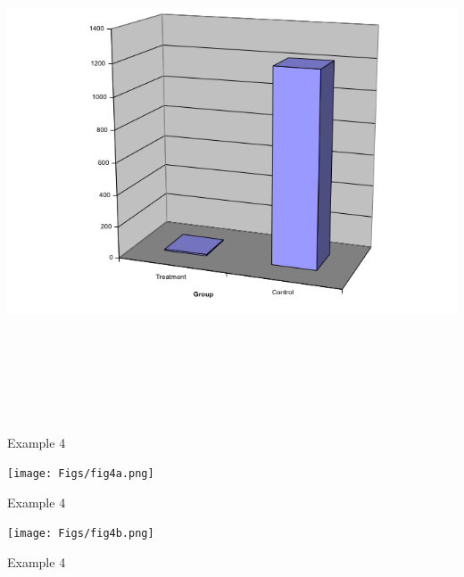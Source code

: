 \documentclass[12pt]{article}
\newcommand{\headsize}{\fontsize{35}{35} \selectfont}
\begin{document}
\centerline{\includegraphics[height=6in]{Figs/fig3d.png}}

\newpage


\headsize \color{myyellow}
\hfill \begin{minipage}{5.75in}
\centering
Example 4
\end{minipage}

\vspace{30mm}

\centerline{\texttt{[image: Figs/fig4a.png]}}




\newpage


\headsize \color{myyellow}
\hfill \begin{minipage}{5.75in}
\centering
Example 4
\end{minipage}

\vspace{30mm}

\centerline{\texttt{[image: Figs/fig4b.png]}}



\newpage


\headsize \color{myyellow}
\hfill \begin{minipage}{5.75in}
\centering
Example 4
\end{minipage}
\end{document}
